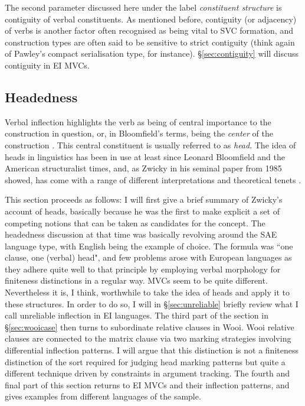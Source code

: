The second parameter discussed here under the label \textit{constituent structure} is contiguity of verbal constituents. As mentioned before, contiguity (or adjacency) of verbs is another factor often recognised as being vital to SVC formation, and construction types are often said to be sensitive to strict contiguity (think again of Pawley's compact serialisation type, for instance). §\ref{sec:contiguity} will discuss contiguity in EI MVCs.

\subsection{Headedness}\label{sec:headedness}

Verbal inflection highlights the verb as being of central importance to the construction in question, or, in Bloomfield's terms, being the \textit{center} of the construction \citep{bloomfield1933language}. This central constituent is usually referred to as \textit{head}. The idea of heads in linguistics has been in use at least since Leonard Bloomfield and the American structuralist times, and, as Zwicky in his seminal paper from 1985 showed, has come with a range of different interpretations and theoretical tenets \citep{zwicky1985heads1}. 

This section proceeds as follows: I will first give a brief summary of Zwicky's account of heads, basically because he was the first to make explicit a set of competing notions that can be taken as candidates for the concept. The headedness discussion at that time was basically revolving around the \textsc{SAE} language type, with English being the example of choice. The formula was ``one clause, one (verbal) head", and few problems arose with European languages as they adhere quite well to that principle by employing verbal morphology for finiteness distinctions in a regular way. MVCs seem to be quite different. Nevertheless it is, I think, worthwhile to take the idea of heads and apply it to these structures. In order to do so, I will in §\ref{sec:unreliable} briefly review what I call unreliable inflection in EI languages. The third part of the section in §\ref{sec:wooicase} then turns to subordinate relative clauses in Wooi. Wooi relative clauses are connected to the matrix clause via two marking strategies involving differential inflection patterns. I will argue that this distinction is not a finiteness distinction of the sort required for judging head marking patterns but quite a different technique driven by constraints in argument tracking. The fourth and final part of this section returns to EI MVCs and their inflection patterns, and gives examples from different languages of the sample.

